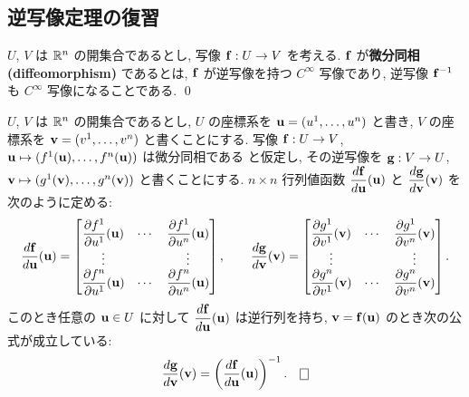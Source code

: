 \documentclass[12pt,twoside]{jarticle}
\begin{document}

\subsection{逆写像定理の復習}

\begin{definition}[$\R^n$ の開集合の微分同相]
 $U$, $V$ は $\R^n$ の開集合であるとし, 写像 ${\mathbf f}:U\to V$ を考える.
 ${\mathbf f}$ が{\bf 微分同相 (diffeomorphism)} であるとは,
 ${\mathbf f}$ が逆写像を持つ $C^\infty$ 写像であり, 
 逆写像 ${\mathbf f}^{-1}$ も $C^\infty$ 写像になることである.
 \qed
\end{definition}

\begin{question}
 $U$, $V$ は $\R^n$ の開集合であるとし, 
 $U$ の座標系を ${\mathbf u}=(u^1,\ldots,u^n)$ と書き, 
 $V$ の座標系を ${\mathbf v}=(v^1,\ldots,v^n)$ と書くことにする.
 写像 ${\mathbf f}:U\to V$, ${\mathbf u}\mapsto(f^1({\mathbf u}),\ldots,f^n({\mathbf u}))$ は微分同相である
 と仮定し, その逆写像を ${\mathbf g}:V\to U$, ${\mathbf v}\mapsto(g^1({\mathbf v}),\ldots,g^n({\mathbf v}))$ 
 と書くことにする.
 $n\times n$ 行列値函数 $\dfrac{d{\mathbf f}}{d{\mathbf u}}({\mathbf u})$ と $\dfrac{d{\mathbf g}}{d{\mathbf v}}({\mathbf v})$ 
 を次のように定める:
 \begin{equation*}
  \dfrac{d{\mathbf f}}{d{\mathbf u}}({\mathbf u})=
   \begin{bmatrix}
    \dfrac{\partial f^1}{\partial u^1}({\mathbf u}) & \cdots & \dfrac{\partial f^1}{\partial u^n}({\mathbf u}) \\
    \vdots                     &        & \vdots \\
    \dfrac{\partial f^n}{\partial u^1}({\mathbf u}) & \cdots & \dfrac{\partial f^n}{\partial u^n}({\mathbf u}) \\
   \end{bmatrix},
   \qquad
  \dfrac{d{\mathbf g}}{d{\mathbf v}}({\mathbf v})=
   \begin{bmatrix}
    \dfrac{\partial g^1}{\partial v^1}({\mathbf v}) & \cdots & \dfrac{\partial g^1}{\partial v^n}({\mathbf v}) \\
    \vdots                     &        & \vdots \\
    \dfrac{\partial g^n}{\partial v^1}({\mathbf v}) & \cdots & \dfrac{\partial g^n}{\partial v^n}({\mathbf v}) \\
   \end{bmatrix}.
 \end{equation*}
 このとき任意の ${\mathbf u}\in U$ に対して $\dfrac{d{\mathbf f}}{d{\mathbf u}}({\mathbf u})$ は逆行列を持ち, 
 ${\mathbf v}={\mathbf f}({\mathbf u})$ のとき次の公式が成立している:
 \begin{equation*}
  \dfrac{d\g}{d\v}(\v) = \left( \dfrac{d\f}{d\u}(\u) \right)^{-1}.
  \qed
 \end{equation*}
\end{question}
\end{document}

